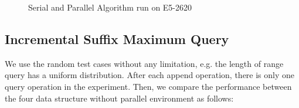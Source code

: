\iffalse
我們運行優化策略中的空間壓縮版本，而非理論分析的 $\theta(1)$ 操作，
單次詢問落在 $O(s)$ 中，在實作上由於可以完全壓在暫存器上操作，效能表現較佳。
\fi

\begin{figure}
  \centering
  \caption{Serial and Parallel Algorithm run on E5-2620}
\end{figure}



\subsection{Incremental Suffix Maximum Query}

We use the random test cases without any limitation, e.g. the length of
range query has a uniform distribution.  After each append operation,
there is only one query operation in the experiment.  Then, we compare
the performance between the four data structure without parallel
environment as follows:

\iffalse
針對插入和詢問次數相同的 ISMQ 問題，運行以下四種數據結構：
\fi

